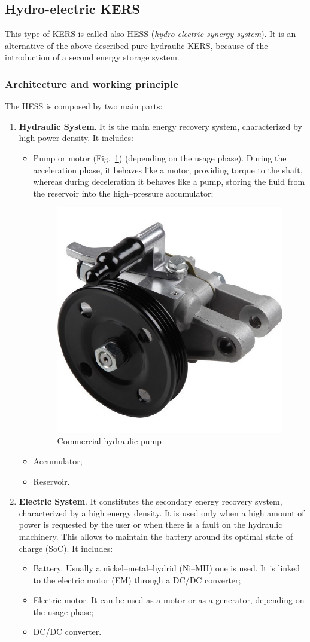 \documentclass[11pt]{article}
\begin{document}
\subsection{Hydro-electric KERS}

This type of KERS is called also HESS (\textit{hydro electric synergy system}). It is an alternative of the above described pure hydraulic KERS, because of the introduction of a second energy storage system.

\subsubsection{Architecture and working principle}

The HESS is composed by two main parts:

\begin{enumerate}
	\item \textbf{Hydraulic System}. It is the main energy recovery system, characterized by high power density. It includes:
	\begin{itemize}
		\item Pump or motor (Fig.~\ref{hydraulic_pump}) (depending on the usage phase). During the acceleration phase, it behaves like a motor, providing torque to the shaft, whereas during deceleration it behaves like a pump, storing the fluid from the reservoir into the high--pressure accumulator;
		\begin{figure}[H]
			\centering
			\includegraphics[width=.3\textwidth]{Images/Hydraulic Pump}
			\caption{Commercial hydraulic pump}
			\label{hydraulic_pump}
		\end{figure}
		
		\item Accumulator;
		\item Reservoir.
	\end{itemize}
	\item \textbf{Electric System}. It constitutes the secondary energy recovery system, characterized by a high energy density. It is used only when a high amount of power is requested by the user or when there is a fault on the hydraulic machinery. This allows to maintain the battery around its optimal state of charge (SoC). It includes:
	\begin{itemize}
		\item Battery. Usually a nickel--metal--hydrid (Ni--MH) one is used. It is linked to the electric motor (EM) through a DC/DC converter;
		\item Electric motor. It can be used as a motor or as a generator, depending on the usage phase;
		\item DC/DC converter.
	\end{itemize}	
\end{enumerate}
\end{document}
